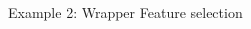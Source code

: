 \documentclass[11pt,compress,t,notes=noshow, xcolor=table]{beamer}
\begin{document}
\begin{vbframe}{Example 2: Wrapper Feature selection}
\begin{columns}
\begin{column}{0.5\textwidth}
\begin{center}
\end{center}
\end{column}
\end{columns}



\end{vbframe}












\end{document}
